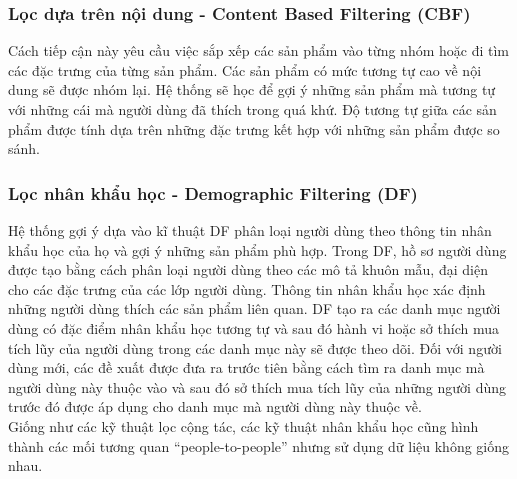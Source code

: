 \subsubsection{Lọc dựa trên nội dung - Content Based Filtering (CBF)}
Cách tiếp cận này yêu cầu việc sắp xếp các sản phẩm vào từng nhóm hoặc đi tìm các đặc trưng của từng sản phẩm. Các sản phẩm có mức tương tự cao về nội dung sẽ được nhóm lại.  Hệ thống sẽ học để gợi ý những sản phẩm mà tương tự với những cái mà người dùng đã thích trong quá khứ. Độ tương tự giữa các sản phẩm được tính dựa trên những đặc trưng kết hợp với những sản phẩm được so sánh.
\subsubsection{Lọc nhân khẩu học - Demographic Filtering (DF)}
Hệ thống gợi ý dựa vào kĩ thuật DF phân loại người dùng theo thông tin nhân khẩu học của họ và gợi ý những sản phẩm phù hợp. Trong DF, hồ sơ người dùng được tạo bằng cách phân loại người dùng theo các mô tả khuôn mẫu, đại diện cho các đặc trưng của các lớp người dùng. Thông tin nhân khẩu học xác định những người dùng thích các sản phẩm liên quan. DF tạo ra các danh mục người dùng có đặc điểm nhân khẩu học tương tự và sau đó hành vi hoặc sở thích mua tích lũy của người dùng trong các danh mục này sẽ được theo dõi. Đối với người dùng mới, các đề xuất được đưa ra trước tiên bằng cách tìm ra danh mục mà người dùng này thuộc vào và sau đó sở thích mua tích lũy của những người dùng trước đó được áp dụng cho danh mục mà người dùng này thuộc về.\\
Giống như các kỹ thuật lọc cộng tác, các kỹ thuật nhân khẩu học cũng hình thành các mối tương quan “people-to-people” nhưng sử dụng dữ liệu không giống nhau.
